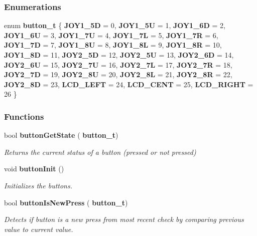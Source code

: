 \subsubsection*{Enumerations}
\begin{DoxyCompactItemize}
\item 
enum \textbf{ button\+\_\+t} \{ \newline
\textbf{ J\+O\+Y1\+\_\+5D} = 0, 
\textbf{ J\+O\+Y1\+\_\+5U} = 1, 
\textbf{ J\+O\+Y1\+\_\+6D} = 2, 
\textbf{ J\+O\+Y1\+\_\+6U} = 3, 
\newline
\textbf{ J\+O\+Y1\+\_\+7U} = 4, 
\textbf{ J\+O\+Y1\+\_\+7L} = 5, 
\textbf{ J\+O\+Y1\+\_\+7R} = 6, 
\textbf{ J\+O\+Y1\+\_\+7D} = 7, 
\newline
\textbf{ J\+O\+Y1\+\_\+8U} = 8, 
\textbf{ J\+O\+Y1\+\_\+8L} = 9, 
\textbf{ J\+O\+Y1\+\_\+8R} = 10, 
\textbf{ J\+O\+Y1\+\_\+8D} = 11, 
\newline
\textbf{ J\+O\+Y2\+\_\+5D} = 12, 
\textbf{ J\+O\+Y2\+\_\+5U} = 13, 
\textbf{ J\+O\+Y2\+\_\+6D} = 14, 
\textbf{ J\+O\+Y2\+\_\+6U} = 15, 
\newline
\textbf{ J\+O\+Y2\+\_\+7U} = 16, 
\textbf{ J\+O\+Y2\+\_\+7L} = 17, 
\textbf{ J\+O\+Y2\+\_\+7R} = 18, 
\textbf{ J\+O\+Y2\+\_\+7D} = 19, 
\newline
\textbf{ J\+O\+Y2\+\_\+8U} = 20, 
\textbf{ J\+O\+Y2\+\_\+8L} = 21, 
\textbf{ J\+O\+Y2\+\_\+8R} = 22, 
\textbf{ J\+O\+Y2\+\_\+8D} = 23, 
\newline
\textbf{ L\+C\+D\+\_\+\+L\+E\+FT} = 24, 
\textbf{ L\+C\+D\+\_\+\+C\+E\+NT} = 25, 
\textbf{ L\+C\+D\+\_\+\+R\+I\+G\+HT} = 26
 \}
\end{DoxyCompactItemize}
\subsubsection*{Functions}
\begin{DoxyCompactItemize}
\item 
bool \textbf{ button\+Get\+State} (\textbf{ button\+\_\+t})
\begin{DoxyCompactList}\small\item\em Returns the current status of a button (pressed or not pressed) \end{DoxyCompactList}\item 
void \textbf{ button\+Init} ()
\begin{DoxyCompactList}\small\item\em Initializes the buttons. \end{DoxyCompactList}\item 
bool \textbf{ button\+Is\+New\+Press} (\textbf{ button\+\_\+t})
\begin{DoxyCompactList}\small\item\em Detects if button is a new press from most recent check by comparing previous value to current value. \end{DoxyCompactList}\end{DoxyCompactItemize}


